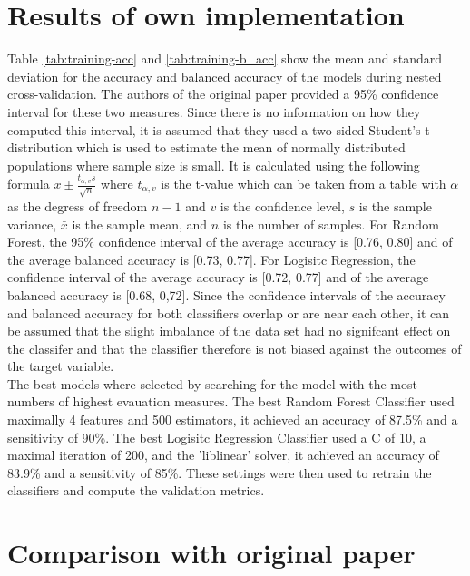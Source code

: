 \section{Results of own implementation}
Table \ref{tab:training-acc} and \ref{tab:training-b_acc} show the mean and 
standard deviation for the accuracy and balanced accuracy of the models during 
nested cross-validation. The authors of the original paper provided a 95\% 
confidence interval for these two measures. Since there is no information on 
how they computed this interval, it is assumed that they used a two-sided 
Student's t-distribution which is used to estimate the mean of normally 
distributed populations where sample size is small. It is calculated using the 
following formula $\bar{x} \pm \frac{t_{\alpha, v}s}{\sqrt{n}}$ where 
$t_{\alpha, v}$ is the t-value which can be taken from a table with $\alpha$ 
as the degress of freedom $n-1$ and $v$ is the confidence level, $s$ is the 
sample variance, $\bar{x}$ is the sample mean, and $n$ is the number of samples.
For Random Forest, the 95\% confidence interval of the average accuracy is 
[0.76, 0.80] and of the average balanced accuracy is [0.73, 0.77]. For Logisitc 
Regression, the confidence interval of the average accuracy is [0.72, 0.77] and 
of the average balanced accuracy is [0.68, 0,72]. Since the confidence 
intervals of the accuracy and balanced accuracy for both classifiers overlap or 
are near each other, it can be assumed that the slight imbalance of the data 
set had no signifcant effect on the classifer and that the classifier therefore 
is not biased against the outcomes of the target variable.
\\
The best models where selected by searching for the model with the most numbers 
of highest evauation measures. The best Random Forest Classifier used maximally 
4 features and 500 estimators, it achieved an accuracy of 87.5\% and a 
sensitivity of 90\%. The best Logisitc Regression Classifier used a C of 10, a 
maximal iteration of 200, and the 'liblinear' solver, it achieved an accuracy 
of 83.9\% and a sensitivity of 85\%. These settings were then used to retrain 
the classifiers and compute the validation metrics.
\section{Comparison with original paper}
